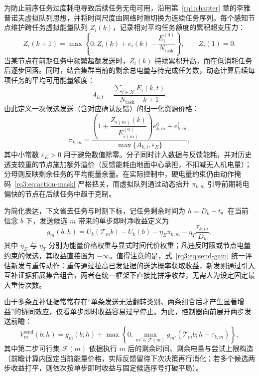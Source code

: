 为防止前序任务过度耗电导致后续任务无电可用，沿用第~\ref{rq1:chapter} 章的李雅普诺夫虚拟队列思想，并将时间尺度由网络时隙切换为连续任务序列。每个感知节点维护跨任务虚拟能量队列 $Z_i(k)$，记录相对平均任务额度的累积超支压力：
\begin{equation}
  Z_i(k+1)=\max\left\{0,Z_i(k)+e_i(k)-\frac{E_i^{(0)}}{N_{\mathrm{task}}}\right\},
  \qquad Z_i(1)=0.
  \label{rq3:eq:virtual-queue}
\end{equation}
当某节点在前期任务中频繁超额发送时，$Z_i(k)$ 持续累积升高，而在低消耗任务后逐步回落。同时，结合集群当前的剩余总电量与待完成任务数，动态计算后续每项任务的平均可用能量额度：
\begin{equation}
  A_{k,t}=\frac{\sum_{i\in\mathcal{N}}E_i(k,t)}{N_{\mathrm{task}}-k+1}.
  \label{rq3:eq:remaining-allowance}
\end{equation}
由此定义一次候选发送（含对应确认反馈）的归一化资源价格：
\begin{equation}
  \pi_{k,m}=\frac{
      \left(1+\dfrac{Z_{s(m)}(k)}{E_{s(m)}^{(0)}}\right)e_{k,m}^{\mathrm d}
      +e_{k,m}^{\mathrm f}}
      {\max\{A_{k,t},\varepsilon_E\}},
  \label{rq3:eq:resource-price}
\end{equation}
其中小常数 $\varepsilon_E>0$ 用于避免数值除零。分子同时计入数据与反馈能耗，并对历史透支较重的节点施加额外溢价（反馈能耗由地面中心承担，不扣减无人机电量）；分母则反映剩余任务的平均能量余量。在实际控制中，硬电量约束仍由动作掩码~\eqref{rq3:eq:action-mask} 严格把关，而虚拟队列通过动态抬升 $\pi_{k,m}$ 引导前期耗电偏快的节点在后续任务中趋于克制。

为简化表达，下文省去任务与时刻下标，记任务剩余时间为 $h=D_k-t$。在当前信念 $b$ 下，发送候选 $m$ 带来的单步即时净收益定义为
\begin{equation}
  g_m(b;h)=U_k(\mathcal T_m b)-U_k(b)
     -\eta_E\pi_{k,m}-\eta_T\frac{\tau_{k,m}}{D_k},
  \label{rq3:eq:send-gain}
\end{equation}
其中 $\eta_E$ 与 $\eta_T$ 分别为能量价格权重与显式时间代价权重；凡违反时限或节点电量约束的候选，其收益直接置为 $-\infty$。值得注意的是，式~\eqref{rq3:eq:send-gain} 统一评估新发与重传动作：重传通过拉高已发证据的送达概率获取收益，新发则通过引入互补证据拓展集合组合，两者在统一框架下直接比拼净收益，无需人为设定固定最大重传次数。

由于多条互补证据常常存在“单条发送无法翻转类别、两条组合后才产生显著增益”的协同效应，仅看单步即时收益容易过早停止。为此，控制器向前展开两步发送前瞻：
\begin{equation}
  V_m^{\mathrm{send}}(b;h)=g_m(b;h)
    +\max\left\{0,\max_{m'\in\mathcal F(m)}
      g_{m'}(\mathcal T_m b;h-\tau_{k,m})\right\},
  \label{rq3:eq:two-step-lookahead}
\end{equation}
其中第二步可行集 $\mathcal F(m)$ 依据执行 $m$ 后的剩余时间、剩余电量与尝试上限构造（前瞻计算内固定当前能量价格，实际反馈留待下次决策再行消化；若多个候选两步收益打平，则依次按单步即时收益与固定候选序号打破平局）。

